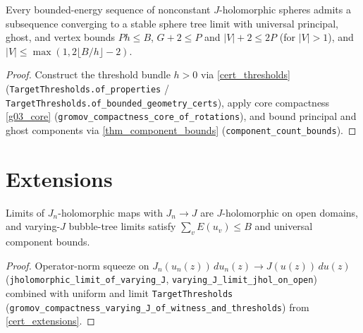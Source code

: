 \begin{theorem}
\label{thm_main}
\leanok
{}
Every bounded-energy sequence of nonconstant $J$-holomorphic spheres admits a subsequence converging
to a stable sphere tree limit with universal principal, ghost, and vertex bounds
$Ph\le B$, $G+2\le P$ and $|V|+2\le 2P$ (for $|V|>1$), and $|V|\le\max(1,2\lfloor B/h\rfloor-2)$.
\end{theorem}
\begin{proof}\leanok Construct the threshold bundle $h>0$ via \cref{cert_thresholds}
(\texttt{TargetThresholds.of\_properties} / \texttt{TargetThresholds.of\_bounded\_geometry\_certs}),
apply core compactness \cref{g03_core} (\texttt{gromov\_compactness\_core\_of\_rotations}), and bound
principal and ghost components via \cref{thm_component_bounds} (\texttt{component\_count\_bounds}).\end{proof}

\chapter{Extensions}

\begin{theorem}
\label{e01_varying}
\leanok
{}
Limits of $J_n$-holomorphic maps with $J_n\to J$ are $J$-holomorphic on open domains, and varying-$J$
bubble-tree limits satisfy $\sum_v E(u_v)\le B$ and universal component bounds.
\end{theorem}
\begin{proof}\leanok Operator-norm squeeze on $J_n(u_n(z))\,du_n(z)\to J(u(z))\,du(z)$ (\texttt{jholomorphic\_limit\_of\_varying\_J}, \texttt{varying\_J\_limit\_jhol\_on\_open}) combined with uniform and limit \texttt{TargetThresholds} (\texttt{gromov\_compactness\_varying\_J\_of\_witness\_and\_thresholds}) from \cref{cert_extensions}.\end{proof}

